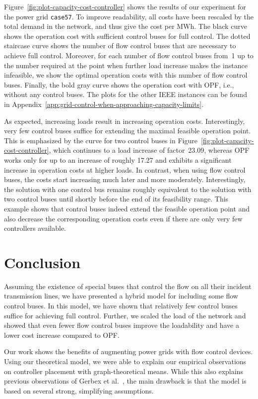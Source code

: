 \documentclass{article}[11pt,a4paper]
\begin{document}
Figure~\ref{fig:plot-capacity-cost-controller} shows the results of
our experiment for the power grid \texttt{case57}.  To improve
readability, all costs have been rescaled by the total demand in the
network, and thus give the cost per MWh.  The black curve shows the
operation cost with sufficient control buses for full control.  The
dotted staircase curve shows the number of flow control buses that are
necessary to achieve full control.  Moreover, for each number of flow
control buses from~1 up to the number required at the point when
further load increase makes the instance infeasible, we show the
optimal operation costs with this number of flow control buses.
Finally, the bold gray curve shows the operation cost with OPF, i.e.,
without any control buses.  The plots for the other IEEE
instances can be found in
Appendix~\ref{app:grid-control-when-approaching-capacity-limits}.

As expected, increasing loads result in increasing operation costs.
Interestingly, very few control buses suffice for extending the
maximal feasible operation point.  This is emphasized by the curve for
two control buses in Figure~\ref{fig:plot-capacity-cost-controller},
which continues to a load increase of factor~23.09, whereas OPF works
only for up to an increase of roughly 17.27 and exhibits a significant
increase in operation costs at higher loads.  In contrast, when using
flow control buses, the costs start increasing much later and more
moderately.  Interestingly, the solution with one control bus remains roughly
equivalent to the solution with two control buses until shortly before
the end of its feasibility range.  This example shows that control buses
indeed extend the feasible operation point and also decrease the corresponding
operation costs even if there are only very few controllers available.
\section{Conclusion}	
\label{sec:conclusion}
Assuming the existence of special buses that control the flow on all
their incident transmission lines, we have presented a hybrid model
for including some flow control buses.  In this model, we have shown
that relatively few control buses suffice for achieving full control.
Further, we scaled the load of the network and showed that even fewer
flow control buses improve the loadability and have a lower cost
increase compared to OPF.

Our work shows the benefits of augmenting power grids with flow
control devices.  Using our theoretical model, we were able to explain
our empirical observations on controller placement with
graph-theoretical means.  While this also explains previous
observations of Gerbex et al.~\cite{gcg-olmtf-01}, the main drawback
is that the model is based on several strong, simplifying assumptions.
\end{document}
